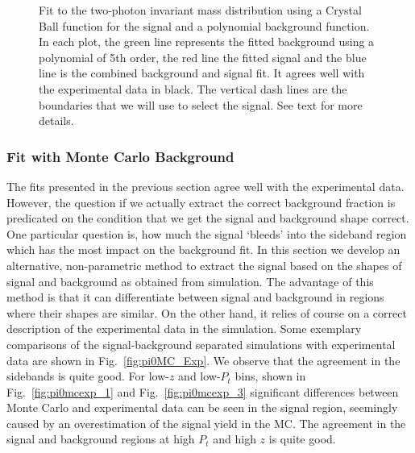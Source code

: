 \begin{figure}
      \caption[Fit to the two-photon invariant-mass distribution using a Crystal Ball function for the signal and a polynomial background function]{Fit to the two-photon invariant mass distribution using a Crystal Ball function for the signal and a polynomial background function. In each plot, the green line represents the fitted background using a polynomial of 5th order, the red line the fitted signal and the blue line is the combined background and signal fit. It agrees well with the experimental data in black. The vertical dash lines are the boundaries that we will use to select the signal. See text for more details.}
  \label{fig:pi0_crystalfit}
\end{figure}

\subsubsection{Fit with Monte Carlo Background}
\label{sec:fit_with_MC_BG}

The fits presented in the previous section agree well with the experimental data. 
However, the question if we actually extract the correct background fraction is predicated on the condition that we get the signal and background shape correct.  One particular question is, how much the signal `bleeds' into the sideband region which has the most impact on the background fit. In this section we  develop an alternative, non-parametric method to extract the signal based on the shapes of signal and background as obtained from simulation. The advantage of this method is that it can differentiate between signal and background in regions where their shapes are similar. On the other hand, it relies of course on a correct description of the experimental data in the simulation.
Some exemplary comparisons of the signal-background separated simulations with experimental data are shown in  Fig.~\ref{fig:pi0MC_Exp}. We observe that the agreement in the sidebands is quite good.  For low-$z$ and low-$P_t$ bins,  shown in Fig.~\ref{fig:pi0mcexp_1} and Fig.~\ref{fig:pi0mcexp_3} significant differences between Monte Carlo and experimental data can be seen in the signal region, seemingly caused by an overestimation of the signal yield in the MC. The agreement in the signal and background regions at high $P_t$ and high $z$ is quite good. 

